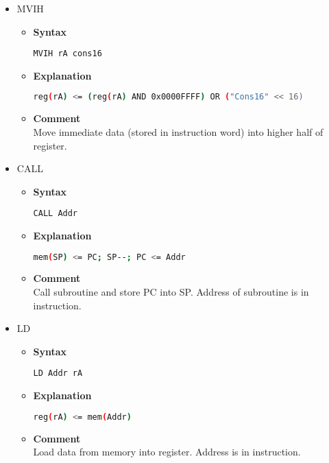 \begin{itemize}
    \item MVIH
    \begin{itemize}
        \item \textbf{Syntax}
        \begin{lstlisting}[language={[x86masm]Assembler}, frame=single]
    MVIH rA cons16
        \end{lstlisting}
        \item \textbf{Explanation}
        \begin{lstlisting}[language=bash, frame=single]
    reg(rA) <= (reg(rA) AND 0x0000FFFF) OR ("Cons16" << 16)
        \end{lstlisting}
        \item \textbf{Comment} \\
    Move immediate data (stored in instruction word) into higher half of register.
    \end{itemize}

    \item CALL
    \begin{itemize}
        \item \textbf{Syntax}
        \begin{lstlisting}[language={[x86masm]Assembler}, frame=single]
    CALL Addr
        \end{lstlisting}
        \item \textbf{Explanation}
        \begin{lstlisting}[language=bash, frame=single]
    mem(SP) <= PC; SP--; PC <= Addr
        \end{lstlisting}
        \item \textbf{Comment} \\
    Call subroutine and store PC into SP. Address of subroutine is in instruction.
    \end{itemize}

    \item LD
    \begin{itemize}
        \item \textbf{Syntax}
        \begin{lstlisting}[language={[x86masm]Assembler}, frame=single]
    LD Addr rA
        \end{lstlisting}
        \item \textbf{Explanation}
        \begin{lstlisting}[language=bash, frame=single]
    reg(rA) <= mem(Addr)
        \end{lstlisting}
        \item \textbf{Comment} \\
    Load data from memory into register. Address is in instruction.
    \end{itemize}


\end{itemize}
